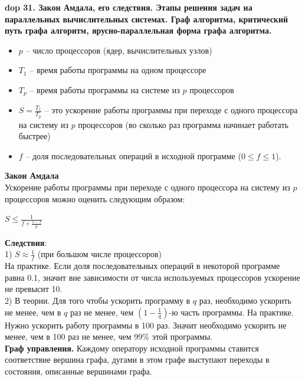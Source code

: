 \setcounter{section}{4}
\setcounter{subsection}{31}
\setcounter{equation}{0}
\textbf{\LARGE dop 31. Закон Амдала, его следствия. Этапы решения задач на параллельных вычислительных системах. Граф алгоритма, критический путь графа алгоритм, ярусно-параллельная форма графа алгоритма.}\\

\begin{itemize}
    \item $p$ – число процессоров (ядер, вычислительных узлов)
    \item $T_{1}$ – время работы программы на одном процессоре
    \item $T_{p}$ – время работы программы на системе из $p$ процессоров
    \item $S = \frac{T_{1}}{T_{p}}$ – это ускорение работы программы при переходе с одного процессора на систему из $p$ процессоров (во сколько раз
программа начинает работать быстрее)
    \item $f$ – доля последовательных операций в исходной программе ($0 \leq f \leq 1$).
\end{itemize}

\textbf{Закон Амдала}\\
Ускорение работы программы при переходе с одного процессора на систему из $p$ процессоров можно оценить следующим образом:
\begin{center}
$S \leq \frac{1}{f + \frac{1 - f}{p}}$
\end{center}

\textbf{Следствия}:\\
1) $S \approx \frac{1}{f}$ (при большом числе процессоров)\\
На практике. Если доля последовательных операций в некоторой программе равна 0.1, значит вне зависимости от числа используемых процессоров ускорение не превысит 10.\\

2) В теории. Для того чтобы ускорить программу в $q$ раз, необходимо ускорить не менее, чем в $q$ раз не менее, чем $(1-\frac{1}{q})$-ю часть программы.
На практике. Нужно ускорить работу программы в 100 раз. Значит необходимо ускорить не менее, чем в 100 раз не менее, чем 99\% этой программы.\\

\textbf{Граф управления.} Каждому оператору исходной программы ставится соответствие вершина графа, дугами в этом графе выступают переходы в состояния, описанные вершинами графа.\\

